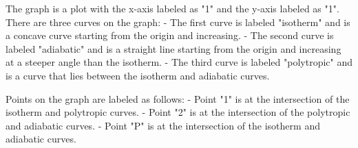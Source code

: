 The graph is a plot with the x-axis labeled as "1" and the y-axis labeled as "1". There are three curves on the graph:
- The first curve is labeled "isotherm" and is a concave curve starting from the origin and increasing.
- The second curve is labeled "adiabatic" and is a straight line starting from the origin and increasing at a steeper angle than the isotherm.
- The third curve is labeled "polytropic" and is a curve that lies between the isotherm and adiabatic curves.

Points on the graph are labeled as follows:
- Point "1" is at the intersection of the isotherm and polytropic curves.
- Point "2" is at the intersection of the polytropic and adiabatic curves.
- Point "P" is at the intersection of the isotherm and adiabatic curves.